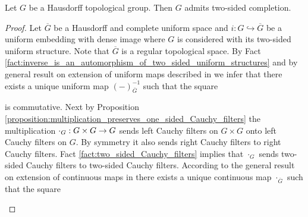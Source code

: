 \documentclass[10pt]{amsart}
\begin{document}
\begin{theorem}\label{theorem:two_sided_completion_always_exists}
	Let $G$ be a Hausdorff topological group. Then $G$ admits two-sided completion.
\end{theorem}
\begin{proof}
	Let $\overline{G}$ be a Hausdorff and complete uniform space and $i:G\hookrightarrow \overline{G}$ be a uniform embedding with dense image where $G$ is considered with its two-sided uniform structure. Note that $\overline{G}$ is a regular topological space. By Fact \ref{fact:inverse_is_an_automorphism_of_two_sided_uniform_structures} and by general result on extension of uniform maps described in \cite{Uniform_Spaces} we infer that there exists a unique uniform map $(-)^{-1}_{\overline{G}}$ such that the square
	\begin{center}
	\end{center}
	is commutative. Next by Proposition \ref{proposition:multiplication_preserves_one_sided_Cauchy_filters} the multiplication $\cdot_G:G\times G \rightarrow G$ sends left Cauchy filters on $G\times G$ onto left Cauchy filters on $G$. By symmetry it also sends right Cauchy filters to right Cauchy filters. Fact \ref{fact:two_sided_Cauchy_filters} implies that $\cdot_{G}$ sends two-sided Cauchy filters to two-sided Cauchy filters. According to the general result on extension of continuous maps in \cite{Filters_in_topology} there exists a unique continuous map $\cdot_{\overline{G}}$ such that the square
	\begin{center}
\end{center}
\end{proof}
\end{document}
